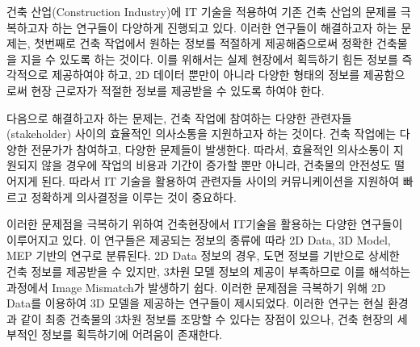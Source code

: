 
건축 산업(Construction Industry)에 IT 기술을 적용하여 기존 건축 산업의 문제를 극복하고자 하는 연구들이 다양하게 진행되고 있다. 이러한 연구들이 해결하고자 하는 문제는, 첫번째로 건축 작업에서 원하는 정보를 적절하게 제공해줌으로써 정확한 건축물을 지을 수 있도록 하는 것이다. 이를 위해서는 실제 현장에서 획득하기 힘든 정보를 즉각적으로 제공하여야 하고\cite{yeh_-site_2012,cote_augmented_2013,chi_research_2013}, 2D 데이터 뿐만이 아니라 다양한 형태의 정보를 제공함으로써 현장 근로자가 적절한 정보를 제공받을 수 있도록 하여야 한다\cite{behzadan_ubiquitous_2008,schall_handheld_2009}. 

다음으로 해결하고자 하는 문제는, 건축 작업에 참여하는 다양한 관련자들(stakeholder) 사이의 효율적인 의사소통을 지원하고자 하는 것이다. 건축 작업에는 다양한 전문가가 참여하고, 다양한 문제들이 발생한다. 따라서, 효율적인 의사소통이 지원되지 않을 경우에 작업의 비용과 기간이 증가할 뿐만 아니라\cite{schall_handheld_2009}, 건축물의 안전성도 떨어지게 된다\cite{wagner_building_2012,lin_using_2014}. 따라서 IT 기술을 활용하여 관련자들 사이의 커뮤니케이션을 지원하여 빠르고 정확하게 의사결정을 이루는 것이 중요하다. %


이러한 문제점을 극복하기 위하여 건축현장에서 IT기술을 활용하는 다양한 연구들이 이루어지고 있다. 이 연구들은 제공되는 정보의 종류에 따라 2D Data, 3D Model, MEP 기반의 연구로 분류된다. 2D Data 정보의 경우, 도면 정보를 기반으로 상세한 건축 정보를 제공받을 수 있지만\cite{yeh_-site_2012,ishii_augmented_2002,cote_augmented_2013}, 3차원 모델 정보의 제공이 부족하므로 이를 해석하는 과정에서 Image Mismatch가 발생하기 쉽다. 이러한 문제점을 극복하기 위해 2D Data를 이용하여 3D 모델을 제공하는 연구들이 제시되었다\cite{wagner_building_2012,dong_collaborative_2013, hou_combining_2014,behzadan_ubiquitous_2008,williams_bim2mar:_2015}. 이러한 연구는 현실 환경과 같이 최종 건축물의 3차원 정보를 조망할 수 있다는 장점이 있으나, 건축 현장의 세부적인 정보를 획득하기에 어려움이 존재한다. 

